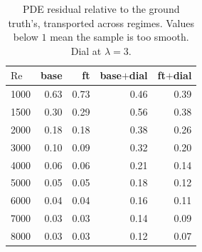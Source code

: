 \begin{table}[t]
  \centering
  \caption{PDE residual relative to the ground truth's, transported across regimes. Values below $1$ mean the sample is too smooth. Dial at $\lambda=3$.}
  \label{tab:transfer-residual}
  \begin{tabular}{lrrrr}
    \toprule
    $\mathrm{Re}$ & base & ft & base$+$dial & ft$+$dial \\
    \midrule
    1000 & 0.63 & 0.73 & 0.46 & 0.39 \\
    1500 & 0.30 & 0.29 & 0.56 & 0.38 \\
    2000 & 0.18 & 0.18 & 0.38 & 0.26 \\
    3000 & 0.10 & 0.09 & 0.32 & 0.20 \\
    4000 & 0.06 & 0.06 & 0.21 & 0.14 \\
    5000 & 0.05 & 0.05 & 0.18 & 0.12 \\
    6000 & 0.04 & 0.04 & 0.16 & 0.11 \\
    7000 & 0.03 & 0.03 & 0.14 & 0.09 \\
    8000 & 0.03 & 0.03 & 0.12 & 0.07 \\
    \bottomrule
  \end{tabular}
\end{table}
